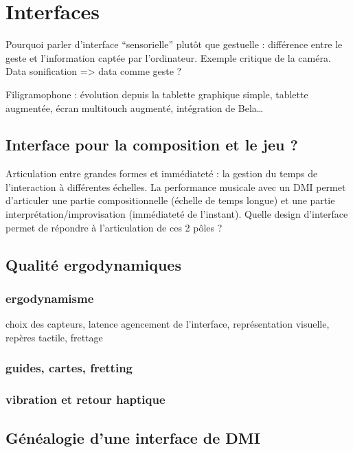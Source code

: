 %
\chapter{Interfaces}
\label{ch:interfaces}


Pourquoi parler d’interface “sensorielle” plutôt que gestuelle : différence entre le geste et l’information captée par l’ordinateur. Exemple critique de la caméra. Data sonification => data comme geste ?

Filigramophone : évolution depuis la tablette graphique simple, tablette augmentée, écran multitouch augmenté, intégration de Bela…

\section{Interface pour la composition et le jeu ?}
Articulation entre grandes formes et immédiateté : la gestion du temps de l’interaction à différentes échelles.
La performance musicale avec un DMI permet d’articuler une partie compositionnelle (échelle de temps longue) et une partie interprétation/improvisation (immédiateté de l’instant). 
Quelle design d’interface permet de répondre à l’articulation de ces 2 pôles ? 

\section{Qualité ergodynamiques}
\subsection{ergodynamisme}
choix des capteurs, latence
agencement de l’interface, représentation visuelle, repères tactile, frettage

\subsection{guides, cartes, fretting}

\subsection{vibration et retour haptique}


\section{Généalogie d’une interface de DMI}
\label{sec:interfaces:sec1}

